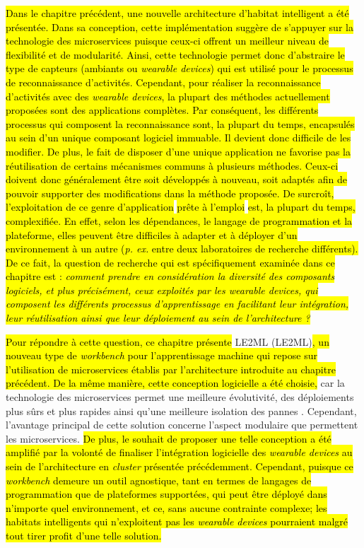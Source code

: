 \hl{Dans le chapitre précédent, une nouvelle architecture d'habitat intelligent a été présentée. Dans sa conception, cette implémentation suggère de s'appuyer sur la technologie des microservices puisque ceux-ci offrent un meilleur niveau de flexibilité et de modularité. Ainsi, cette technologie permet donc d'abstraire le type de capteurs (ambiants ou \textit{wearable devices}) qui est utilisé pour le processus de reconnaissance d'activités. Cependant, pour réaliser la reconnaissance d'activités avec des \textit{wearable devices}, la plupart des méthodes actuellement proposées sont des applications complètes. Par conséquent, les différents processus qui composent la reconnaissance sont, la plupart du temps, encapsulés au sein d'un unique composant logiciel immuable. Il devient donc difficile de les modifier. De plus, le fait de disposer d'une unique application ne favorise pas la réutilisation de certains mécanismes communs à plusieurs méthodes. Ceux-ci doivent donc généralement être soit développés à nouveau, soit adaptés afin de pouvoir supporter des modifications dans la méthode proposée. De surcroît, l'exploitation de ce genre d'application} \og \hl{prête à l'emploi} \fg \hl{est, la plupart du temps, complexifiée. En effet, selon les dépendances, le langage de programmation et la plateforme, elles peuvent être difficiles à adapter et à déployer d'un environnement à un autre (\textit{p. ex.} entre deux laboratoires de recherche différents). De ce fait, la question de recherche qui est spécifiquement examinée dans ce chapitre est : \textit{\og comment prendre en considération la diversité des composants logiciels, et plus précisément, ceux exploités par les \textit{wearable devices}, qui composent les différents processus d'apprentissage en facilitant leur intégration, leur réutilisation ainsi que leur déploiement au sein de l'architecture ? \fg}}

\hl{Pour répondre à cette question, ce chapitre présente} \acs{LE2ML} (\acl{LE2ML})\hl{, un nouveau type de \textit{workbench} pour l'apprentissage machine qui repose sur l'utilisation de microservices établis par l'architecture introduite au chapitre précédent. De la même manière, cette conception logicielle a été choisie, }car la technologie des microservices permet une meilleure évolutivité, des déploiements plus sûrs et plus rapides ainsi qu'une meilleure isolation des pannes \citep{Dragoni2017}. Cependant, l'avantage principal de cette solution concerne l'aspect modulaire que permettent les microservices. \hl{De plus, le souhait de proposer une telle conception a été amplifié par la volonté de finaliser l'intégration logicielle des \textit{wearable devices} au sein de l'architecture en \textit{cluster} présentée précédemment. Cependant, puisque ce \textit{workbench} demeure un outil agnostique, tant en termes de langages de programmation que de plateformes supportées, qui peut être déployé dans n'importe quel environnement, et ce, sans aucune contrainte complexe; les habitats intelligents qui n'exploitent pas les \textit{wearable devices} pourraient malgré tout tirer profit d'une telle solution.}

